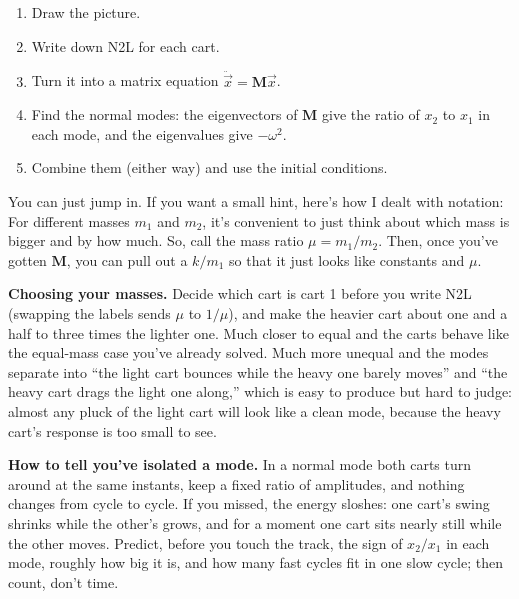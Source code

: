 \documentclass[12pt]{article}
\numberwithin{equation}{section}
\begin{document}
\begin{enumerate}
\item[1.] Draw the picture.
\item[2.] Write down N2L for each cart.
\item[3.] Turn it into a matrix equation $\ddot{\vec{x}} = \mathbf{M}\vec{x}$.
\item[4.] Find the normal modes: the eigenvectors of $\mathbf{M}$ give the
  ratio of $x_2$ to $x_1$ in each mode, and the eigenvalues give
  $-\omega^2$.
\item[5.] Combine them (either way) and use the initial conditions.
\end{enumerate}

\noindent You can just jump in. If you want a small hint, here's how I dealt
with notation: For different masses $m_1$ and $m_2$, it's convenient to just
think about which mass is bigger and by how much. So, call the mass ratio $\mu =
m_1/m_2$. Then, once you've gotten $\mathbf{M}$, you can pull out a $k/m_1$ so
that it just looks like constants and $\mu$.

\medskip

\noindent\textbf{Choosing your masses.} Decide which cart is cart 1
before you write N2L (swapping the labels sends $\mu$ to $1/\mu$), and make
the heavier cart about one and a half to three times the lighter one. Much
closer to equal and the carts behave like the equal-mass case you've
already solved. Much more unequal and the modes separate into ``the light
cart bounces while the heavy one barely moves'' and ``the heavy cart drags
the light one along,'' which is easy to produce but hard to judge: almost
any pluck of the light cart will look like a clean mode, because the heavy
cart's response is too small to see.

\medskip

\noindent\textbf{How to tell you've isolated a mode.} In a normal mode both
carts turn around at the same instants, keep a fixed ratio of amplitudes,
and nothing changes from cycle to cycle. If you missed, the energy sloshes:
one cart's swing shrinks while the other's grows, and for a moment one cart
sits nearly still while the other moves. Predict, before you touch the
track, the sign of $x_2/x_1$ in each mode, roughly how big it is, and how
many fast cycles fit in one slow cycle; then count, don't time.
\end{document}
